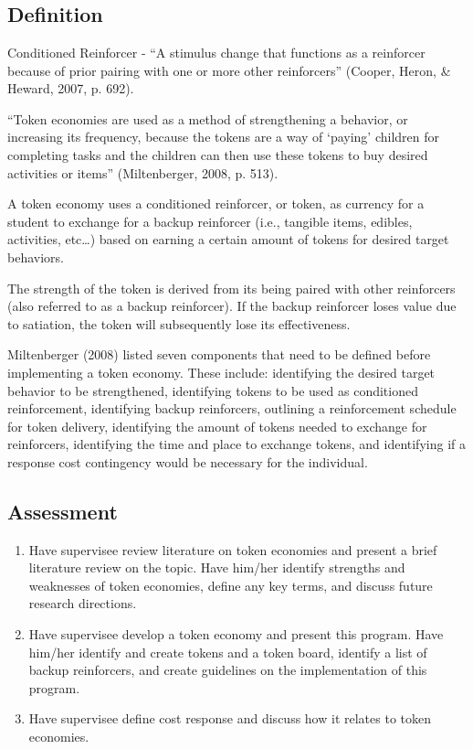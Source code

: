 \section[\fourfTwo{}]{\fourfTwo{}%
              }
\subsection{Definition}
Conditioned Reinforcer - ``A stimulus change that functions as a reinforcer because of prior pairing with one or more other reinforcers'' (Cooper, Heron, \& Heward, 2007, p. 692).

``Token economies are used as a method of strengthening a behavior, or increasing its frequency, because the tokens are a way of ‘paying' children for completing tasks and the children can then use these tokens to buy desired activities or items'' (Miltenberger, 2008, p. 513).

A token economy uses a conditioned reinforcer, or token, as currency for a student to exchange for a backup reinforcer (i.e., tangible items, edibles, activities, etc…) based on earning a certain amount of tokens for desired target behaviors. 

The strength of the token is derived from its being paired with other reinforcers (also referred to as a backup reinforcer). If the backup reinforcer loses value due to satiation, the token will subsequently lose its effectiveness.

Miltenberger (2008) listed seven components that need to be defined before implementing a token economy. These include: identifying the desired target behavior to be strengthened, identifying tokens to be used as conditioned reinforcement, identifying backup reinforcers, outlining a reinforcement schedule for token delivery, identifying the amount of tokens needed to exchange for reinforcers, identifying the time and place to exchange tokens, and identifying if a response cost contingency would be necessary for the individual. 


\subsection{Assessment}
\begin{enumerate}
\item Have supervisee review literature on token economies and present a brief literature review on the topic. Have him/her identify strengths and weaknesses of token economies, define any key terms, and discuss future research directions.
\item Have supervisee develop a token economy and present this program. Have him/her identify and create tokens and a token board, identify a list of backup reinforcers, and create guidelines on the implementation of this program.
\item Have supervisee define cost response and discuss how it relates to token economies.
\end{enumerate}
%
